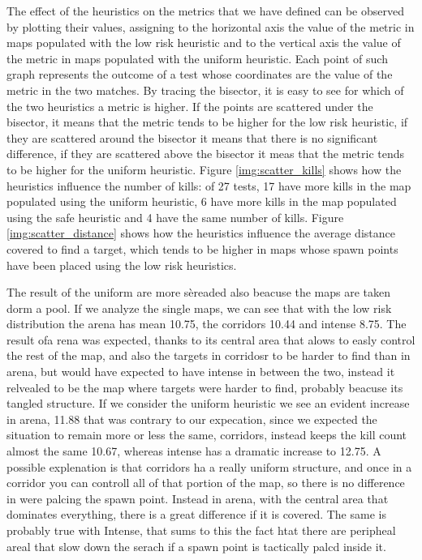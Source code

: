 The effect of the heuristics on the metrics that we have defined can be observed by plotting their values, assigning to the horizontal axis the value of the metric in maps populated with the low risk heuristic and to the vertical axis the value of the metric in maps populated with the uniform heuristic. Each point of such graph represents the outcome of a test whose coordinates are the value of the metric in the two matches. By tracing the bisector, it is easy to see for which of the two heuristics a metric is higher. If the points are scattered under the bisector, it means that the metric tends to be higher for the low risk heuristic, if they are scattered around the bisector it means that there is no significant difference, if they are scattered above the bisector it meas that the metric tends to be higher for the uniform heuristic. Figure \ref{img:scatter_kills} shows how the heuristics influence the number of kills: of 27 tests, 17 have more kills in the map  populated using the uniform heuristic, 6 have more kills in the map populated using the safe heuristic and 4 have the same number of kills. Figure \ref{img:scatter_distance} shows how the heuristics influence the average distance covered to find a target, which tends to be higher in maps whose spawn points have been placed using the low risk heuristics.

\par

The result of the uniform are more sèreaded also beacuse the maps are taken dorm a pool. If we analyze the single maps, we can see that with the low risk distribution the arena has mean 10.75, the corridors 10.44 and intense 8.75. The result ofa rena was expected, thanks to its central area that alows to easly control the rest of the map, and also the targets in corridosr to be harder to find than in arena, but would have expected to have intense in between the two, instead it relvealed to be the map where targets were harder to find, probably beacuse its tangled structure. If we consider the uniform heuristic we see an evident increase in arena, 11.88 that was contrary to our expecation, since we expected the situation to remain more or less the same, corridors, instead keeps the kill count almost the same 10.67, whereas intense has a dramatic increase to 12.75. A possible explenation is that corridors ha a really uniform structure, and once in a corridor you can controll all of that portion of the map, so there is no difference in were palcing the spawn point. Instead in arena, with the central area that dominates everything, there is a great difference if it is covered. The same is probably true with Intense, that sums to this the fact htat there are peripheal areal that slow down the serach if a spawn point is tactically palcd inside it.

